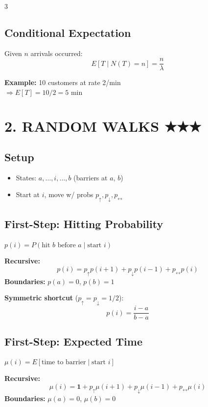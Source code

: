 \documentclass[7pt,landscape]{extarticle}
\begin{document}
\begin{multicols}{3}
\subsection*{Conditional Expectation}
\begin{compactbox}
Given $n$ arrivals occurred:
$$\boxed{E[T \mid N(T) = n] = \frac{n}{\lambda}}$$
\end{compactbox}

\textbf{Example:} 10 customers at rate 2/min \\
$\Rightarrow E[T] = 10/2 = 5$ min

\section*{2. RANDOM WALKS ★★★}

\subsection*{Setup}
\begin{itemize}
\item States: $a, \ldots, i, \ldots, b$ (barriers at $a$, $b$)
\item Start at $i$, move w/ probs $p_\uparrow, p_\downarrow, p_\leftrightarrow$
\end{itemize}

\subsection*{First-Step: Hitting Probability}
$p(i) = P(\text{hit } b \text{ before } a \mid \text{start } i)$

\begin{compactbox}
\textbf{Recursive:}
$$p(i) = p_\uparrow p(i+1) + p_\downarrow p(i-1) + p_\leftrightarrow p(i)$$
\textbf{Boundaries:} $p(a) = 0$, $p(b) = 1$
\end{compactbox}

\textbf{Symmetric shortcut} ($p_\uparrow = p_\downarrow = 1/2$):
$$\boxed{p(i) = \frac{i-a}{b-a}}$$

\subsection*{First-Step: Expected Time}
$\mu(i) = E[\text{time to barrier} \mid \text{start } i]$

\begin{compactbox}
\textbf{Recursive:}
$$\mu(i) = \mathbf{1} + p_\uparrow \mu(i+1) + p_\downarrow \mu(i-1) + p_\leftrightarrow \mu(i)$$
\textbf{Boundaries:} $\mu(a) = 0$, $\mu(b) = 0$


\end{compactbox}
\end{multicols}
\end{document}
